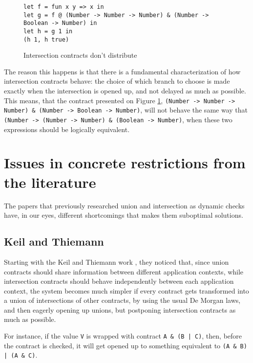 \documentclass[sigplan,10pt,review,anonymous]{acmart}
\newcommand{\unsure}[2][1=]{}
\newcommand{\info}[2][1=]{}
\newcommand{\nickel}[1]{\lstinline[language=nickel]{#1}}
\begin{document}
\begin{figure}[h]
\begin{lstlisting}[language=nickel]
let f = fun x y => x in
let g = f @ (Number -> Number -> Number) & (Number -> Boolean -> Number) in
let h = g 1 in 
(h 1, h true)
\end{lstlisting}
\caption{Intersection contracts don't distribute}
\label{fig:intersection-distrbution}
\end{figure}

The reason this happens is that
there is a fundamental characterization of how intersection
contracts behave: the choice of which branch to choose is made exactly
when the intersection is opened up, and not delayed as much as possible.
This means, that the contract presented on Figure \ref{fig:intersection-distrbution},
\nickel{(Number -> Number -> Number) & (Number -> Boolean -> Number)},
will not behave the same way that
\nickel{(Number -> (Number -> Number) & (Boolean -> Number)},
when these two expressions should be logically equivalent.


\newpage

\section{Issues in concrete restrictions from the literature}
\info{The various papers and the tradeoffs they make}

The papers that previously researched union and intersection
as dynamic checks have, in our eyes, different shortcomings
that makes them suboptimal solutions.

\subsection{Keil and Thiemann}
\label{sec:keil-thiemann}
\unsure{Subsection title?}
Starting with the Keil and Thiemann work \cite{KeilThiemannUnionIntersection},
they noticed that, since union contracts should share information between
different application contexts, while intersection contracts should behave
independently between each application context, the system becomes much
simpler if every contract gets transformed into a union of intersections
of other contracts, by using the usual De Morgan laws,
and then eagerly opening up unions, but postponing intersection
contracts as much as possible.

For instance, if the value \nickel{V} is wrapped with contract
\nickel{A & (B | C)}, then, before the contract is checked,
it will get opened up to something equivalent to
\nickel{(A & B) | (A & C)}.
\end{document}
